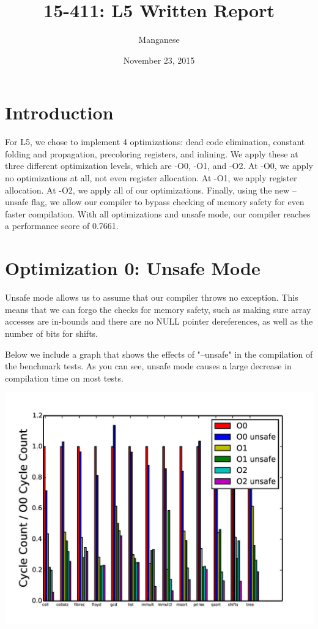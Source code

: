 \documentclass{article}
\title{15-411: L5 Written Report}
\author{Manganese}
\date{November 23, 2015}
\begin{document}
\maketitle

\section{Introduction}

For L5, we chose to implement 4 optimizations: dead code elimination, constant folding and propagation, precoloring registers, and inlining. We apply these at three different optimization levels, which are -O0, -O1, and -O2. At -O0, we apply no optimizations at all, not even register allocation. At -O1, we apply register allocation. At -O2, we apply all of our optimizations. Finally, using the new --unsafe flag, we allow our compiler to bypass checking of memory safety for even faster compilation. With all optimizations and unsafe mode, our compiler reaches a performance score of 0.7661.

\section{Optimization 0: Unsafe Mode}

Unsafe mode allows us to assume that our compiler throws no exception. This means that we can forgo the checks for memory safety, such as making sure array accesses are in-bounds and there are no NULL pointer dereferences, as well as the number of bits for shifts. 

Below we include a graph that shows the effects of "--unsafe" in the compilation of the benchmark tests. As you can see, unsafe mode causes a large decrease in compilation time on most tests. 

\includegraphics[scale=0.5]{everything-page-001}
\end{document}
